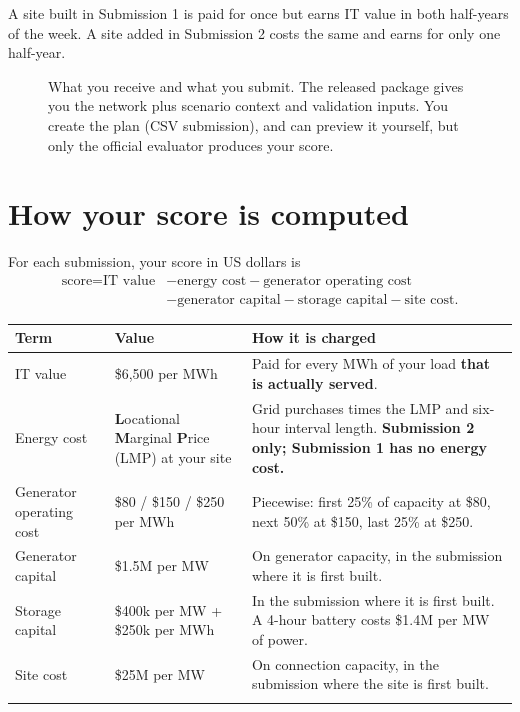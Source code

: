 \documentclass[10pt]{article}
\begin{document}
\begin{keybox}
A site built in Submission 1 is paid for once but earns IT value in both
half-years of the week. A site added in Submission 2 costs the same and earns
for only one half-year.
\end{keybox}

\begin{figure}[htbp]
  \centering
  
  \caption{What you receive and what you submit. The released package gives
  you the network plus scenario context and validation inputs. You create the
  plan (CSV submission), and can preview it yourself, but only the official evaluator
  produces your score.}
  \label{fig:pipeline}
\end{figure}

\section{How your score is computed}\label{sec:score}

For each submission, your score in US dollars is
\[
\begin{aligned}
  \text{score} = \text{IT value}
  &- \text{energy cost} - \text{generator operating cost}\\
  &- \text{generator capital} - \text{storage capital} - \text{site cost}.
\end{aligned}
\]

\begin{center}
\small
\begin{tabularx}{\linewidth}{@{}l X X@{}}
\toprule
Term & Value & How it is charged\\
\midrule
IT value & \$6,500 per MWh & Paid for every MWh of your load \textbf{that is actually served}.\\
Energy cost & \textbf{L}ocational \textbf{M}arginal \textbf{P}rice (LMP) at your site & Grid purchases times the LMP and six-hour interval length. \textbf{Submission 2 only; Submission 1 has no energy cost.}\\
Generator operating cost & \$80 / \$150 / \$250 per MWh & Piecewise: first 25\% of capacity at \$80, next 50\% at \$150, last 25\% at \$250.\\
Generator capital & \$1.5M per MW & On generator capacity, in the submission where it is first built.\\
Storage capital & \$400k per MW + \$250k per MWh & In the submission where it is first built. A 4-hour battery costs \$1.4M per MW of power.\\
Site cost & \$25M per MW & On connection capacity, in the submission where the site is first built.\\
\bottomrule
\label{tab:hyperparameters}
\end{tabularx}
\end{center}
\end{document}
